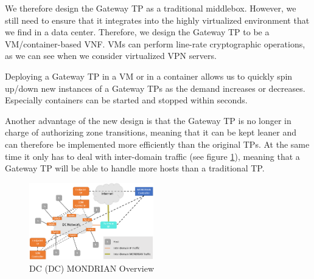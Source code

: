 We therefore design the Gateway \acs{TP} as a traditional middlebox. However, we still need to ensure that it integrates into the highly virtualized environment that we find in a data center. Therefore, we design the Gateway \acs{TP} to be a \acs{VM}/container-based \acs{VNF}. \aclp{VM} can perform line-rate cryptographic operations, as we can see when we consider virtualized \acs{VPN} servers.

Deploying a Gateway \acs{TP} in a \acs{VM} or in a container allows us to quickly spin up/down new instances of a Gateway \acsp{TP} as the demand increases or decreases. Especially containers can be started and stopped within seconds. 

Another advantage of the new design is that the Gateway \acs{TP} is no longer in charge of authorizing zone transitions, meaning that it can be kept leaner and can therefore be implemented more efficiently than the original \acsp{TP}. At the same time it only has to deal with inter-domain traffic (see figure \ref{DC MONDRIAN Overview}), meaning that a Gateway \acs{TP} will be able to handle more hosts than a traditional \acs{TP}. 

\begin{figure}[t]
	\centering
	\includegraphics[width =0.48\textwidth]{img/DC_Mondrian_overview2.png}
	\caption{\acs{DC} (\acl{DC}) MONDRIAN Overview}
	\label{DC MONDRIAN Overview}
\end{figure}

